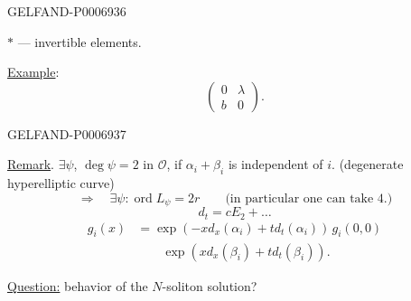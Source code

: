 \begin{GelfandAdjacentEvidence}{GELFAND-P000693}{6}


\(*\) --- invertible elements.

\underline{Example}:
\[
\begin{pmatrix}0&\lambda\\ b&0\end{pmatrix}.
\]
\end{GelfandAdjacentEvidence}
\begin{GelfandAdjacentEvidence}{GELFAND-P000693}{7}


\underline{Remark}.
\(\exists\psi\), \(\operatorname{deg}\psi=2\) in \(\mathcal O\),
if \(\alpha_i+\beta_i\) is independent of \(i\).
(degenerate hyperelliptic curve)
\[
\Rightarrow\quad\exists\psi:\operatorname{ord}L_\psi=2r
\qquad\text{(in particular one can take \(4\).)}
\]
\[
d_t=cE_2+\ldots
\]
\[
\begin{aligned}
g_i(x)&=\exp(-x d_x(\alpha_i)+t d_t(\alpha_i))\,g_i(0,0)\\
&\qquad\exp(x d_x(\beta_i)+t d_t(\beta_i)).
\end{aligned}
\]
\end{GelfandAdjacentEvidence}


\underline{Question:} behavior of the \(N\)-soliton solution?


